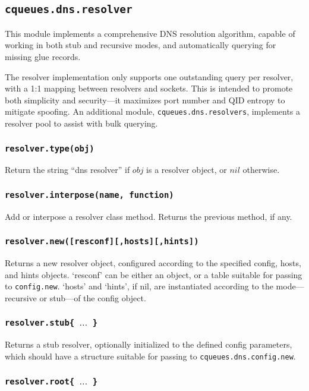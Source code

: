 \documentclass[11pt, oneside]{memoir}
\newcommand*{\routine}[1]{\texttt{#1}\xspace}
\newcommand*{\fn}[1]{\texttt{#1}\xspace}
\newcommand*{\module}[1]{\texttt{#1}\xspace}
\newcounter{toccols}
\newenvironment{Module}[1]{
	\subsection{\texttt{#1}}
	\addtocontents{toc}{
		\protect\begin{multicols}{\value{toccols}}
	}
}{
	\addtocontents{toc}{\protect\end{multicols}}
}
\begin{document}
\begin{Module}{cqueues.dns.resolver}

This module implements a comprehensive DNS resolution algorithm, capable of working in both stub and recursive modes, and automatically querying for missing glue records.

The resolver implementation only supports one outstanding query per resolver, with a 1:1 mapping between resolvers and sockets. This is intended to promote both simplicity and security---it maximizes port number and QID entropy to mitigate spoofing. An additional module, \module{cqueues.dns.resolvers}, implements a resolver pool to assist with bulk querying.

\subsubsection[\routine{resolver.type}]{\routine{resolver.type(obj)}}
Return the string ``dns resolver'' if $obj$ is a resolver object, or $nil$ otherwise.

\subsubsection[\fn{resolver.interpose}]{\fn{resolver.interpose(name, function)}}

Add or interpose a resolver class method. Returns the previous method, if any.

\subsubsection[\fn{resolver.new}]{\fn{resolver.new([resconf][,hosts][,hints])}}

Returns a new resolver object, configured according to the specified config, hosts, and hints objects. `resconf' can be either an object, or a table suitable for passing to \fn{config.new}. `hosts' and `hints', if nil, are instantiated according to the mode---recursive or stub---of the config object.

\subsubsection[\fn{resolver.stub}]{\fn{resolver.stub\{ $\ldots$ \}}}

Returns a stub resolver, optionally initialized to the defined config parameters, which should have a structure suitable for passing to \fn{cqueues.dns.config.new}.

\subsubsection[\fn{resolver.root}]{\fn{resolver.root\{ $\ldots$ \}}}


\end{Module}
\end{document}
